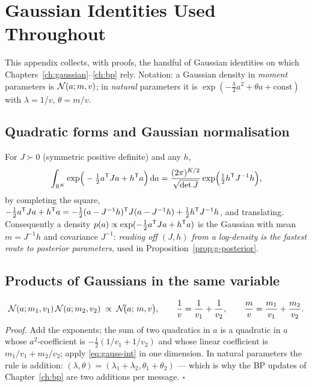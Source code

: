 \chapter{Gaussian Identities Used Throughout}\label{app:gauss}

This appendix collects, with proofs, the handful of Gaussian identities on
which Chapters~\ref{ch:gaussian}--\ref{ch:bp} rely. Notation: a Gaussian
density in \emph{moment} parameters is $\mathcal{N}(a; m, v)$; in \emph{natural}
parameters it is
$\exp(-\tfrac{\lambda}{2} a^2 + \theta a + \mathrm{const})$ with
$\lambda = 1/v$, $\theta = m/v$.

\section{Quadratic forms and Gaussian normalisation}

For $J \succ 0$ (symmetric positive definite) and any $h$,
\begin{equation}
  \int_{\mathbb{R}^K} \exp\!\Big( -\tfrac{1}{2} a^{\mathsf{T}} J a + h^{\mathsf{T}} a \Big)\, \mathrm{d} a
  = \frac{(2\pi)^{K/2}}{\sqrt{\det J}}
    \exp\!\Big( \tfrac{1}{2} h^{\mathsf{T}} J^{-1} h \Big),
  \label{eq:gauss-int}
\end{equation}
by completing the square, $-\tfrac{1}{2}a^{\mathsf{T}} J a + h^{\mathsf{T}} a =
-\tfrac{1}{2}(a - J^{-1}h)^{\mathsf{T}} J (a - J^{-1}h) + \tfrac{1}{2} h^{\mathsf{T}} J^{-1}h$,
and translating. Consequently a density
$p(a) \propto \exp(-\tfrac{1}{2} a^{\mathsf{T}} J a + h^{\mathsf{T}} a)$ is the Gaussian with
mean $m = J^{-1} h$ and covariance $J^{-1}$: \emph{reading off $(J, h)$
from a log-density is the fastest route to posterior parameters}, used in
Proposition~\ref{prop:g-posterior}.

\section{Products of Gaussians in the same variable}

\begin{equation}
  \mathcal{N}(a; m_1, v_1)\, \mathcal{N}(a; m_2, v_2)
  \;\propto\; \mathcal{N}\!\big(a;\, m, v\big),
  \qquad
  \frac{1}{v} = \frac{1}{v_1} + \frac{1}{v_2},
  \qquad
  \frac{m}{v} = \frac{m_1}{v_1} + \frac{m_2}{v_2}.
  \label{eq:gauss-product}
\end{equation}
\emph{Proof.} Add the exponents; the sum of two quadratics in $a$ is a
quadratic in $a$ whose $a^2$-coefficient is
$-\tfrac{1}{2}(1/v_1 + 1/v_2)$ and whose linear coefficient is
$m_1/v_1 + m_2/v_2$; apply \eqref{eq:gauss-int} in one dimension. In
natural parameters the rule is addition:
$(\lambda, \theta) = (\lambda_1 + \lambda_2, \theta_1 + \theta_2)$ ---
which is why the BP updates of Chapter~\ref{ch:bp} are two additions per
message. $\square$

